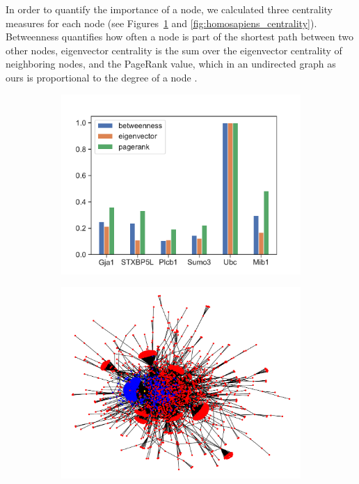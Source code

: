 \documentclass[9pt,onecolumn,twoside]{pnas-new}
\begin{document}
In order to quantify the importance of a node, we calculated three centrality measures for each node (see Figures~\ref{fig:rat_centrality} and \ref{fig:homosapiens_centrality}). Betweenness quantifies how often a node is part of the shortest path between two other nodes, eigenvector centrality is the sum over the eigenvector centrality of neighboring nodes, and the PageRank value, which in an undirected graph as ours is proportional to the degree of a node \cite{grolmusz2015}. 

\begin{figure}
\centering
\begin{subfigure}{.42\textwidth}
    \centering
    \vspace{2.2em}
    \includegraphics[width=\columnwidth]{images/rat_centrality.pdf}
    \vspace{1.1em}
    \caption{}
    \label{fig:rat_centrality}
\end{subfigure}%
\begin{subfigure}{.58\textwidth}
    \centering
    \vspace{-1em}
    \includegraphics[width=\columnwidth]{images/rat_network.pdf}

\end{subfigure}
\end{figure}
\end{document}
